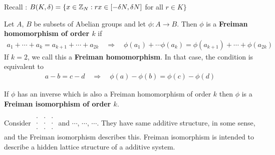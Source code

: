 \documentclass[10pt,a4paper]{report}
\begin{document}
Recall : $B(K,\delta) = \{x\in \mathbb{Z}_N : rx\in [-\delta N, \delta N]$ for all $r\in K \}$
\s

 Let $A$, $B$ be subsets of Abelian groups and let $\phi : A\rightarrow B$. Then $\phi$ is a \textbf{Freiman homomorphism of order $k$} if
\begin{align*}
a_1 + \cdots + a_k = a_{k+1} + \cdots + a_{2k} \quad \Rightarrow \quad \phi(a_1) + \cdots \phi(a_k) = \phi(a_{k+1}) +\cdots +\phi(a_{2k})
\end{align*}
If $k=2$, we call this a \textbf{Freiman homomorphism}. In that case, the condition is equivalent to
\begin{align*}
a-b = c-d \quad \Rightarrow \quad \phi(a) - \phi(b) = \phi(c) - \phi(d)
\end{align*}

\quad If $\phi$ has an inverse which is also a Freiman homomorphism of order $k$ then $\phi$ is a \textbf{Freiman isomorphism of order $k$}.


\s

Consider \quad $\begin{matrix}
\cdot & \cdot & \cdot \\
\cdot & \cdot & \cdot \\
\cdot & \cdot & \cdot
\end{matrix}
$ \quad and $\cdots$, $\cdots$, $\cdots$. They have same additive structure, in some sense, and the Freiman isomorphism describes this. Freiman isomorphism is intended to describe a hidden lattice structure of a additive system.
\s

\renewcommand{\vec}{\underline}
\end{document}
